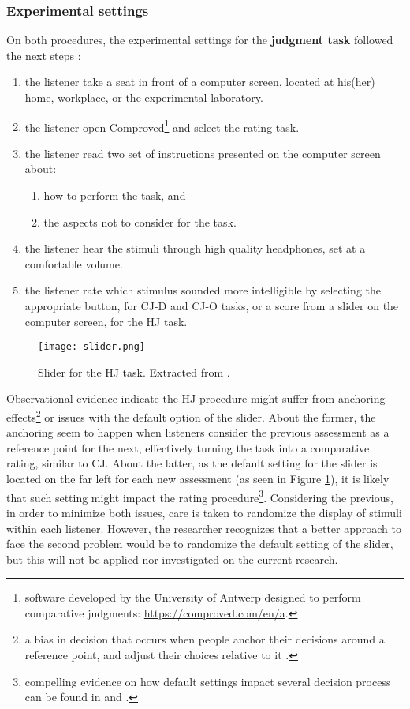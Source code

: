 \subsubsection{Experimental settings} \label{ss_sect:expset}
%
On both procedures, the experimental settings for the \textbf{judgment task} followed the next steps \citep{Boonen_et_al_2020, Boonen_et_al_2021}:
%
\begin{enumerate} \itemsep1pt
	\item the listener take a seat in front of a computer screen, located at his(her) home, workplace, or the experimental laboratory.
	\item the listener open Comproved\footnote{software developed by the University of Antwerp designed to perform comparative judgments: \url{https://comproved.com/en/a}.} and select the rating task.
	\item the listener read two set of instructions presented on the computer screen about:
	\begin{enumerate}
		\item how to perform the task, and
		\item the aspects not to consider for the task.
	\end{enumerate}
	\item the listener hear the stimuli through high quality headphones, set at a comfortable volume.
	\item the listener rate which stimulus sounded more intelligible by selecting the appropriate button, for CJ-D and CJ-O tasks, or a score from a slider on the computer screen, for the HJ task.
\end{enumerate}
%
\begin{figure}[h]
	\centering
	\texttt{[image: slider.png]}
	\caption[Slider for the HJ task.]%
	{Slider for the HJ task. Extracted from \citet{Boonen_et_al_2021}.}
	\label{fig:slider}
\end{figure}
%
Observational evidence indicate the HJ procedure might suffer from anchoring effects\footnote{a bias in decision that occurs when people anchor their decisions around a reference point, and adjust their choices relative to it \cite{Baddeley_2017, Kahneman_2013}.} or issues with the default option of the slider. About the former, the anchoring seem to happen when listeners consider the previous assessment as a reference point for the next, effectively turning the task into a comparative rating, similar to CJ. About the latter, as the default setting for the slider is located on the far left for each new assessment (as seen in Figure \ref{fig:slider}), it is likely that such setting might impact the rating procedure\footnote{compelling evidence on how default settings impact several decision process can be found in \citet{Kahneman_2013} and \citet{Johnson_et_al_2003}.}. Considering the previous, in order to minimize both issues, care is taken to randomize the display of stimuli within each listener. However, the researcher recognizes that a better approach to face the second problem would be to randomize the default setting of the slider, but this will not be applied nor investigated on the current research. 

